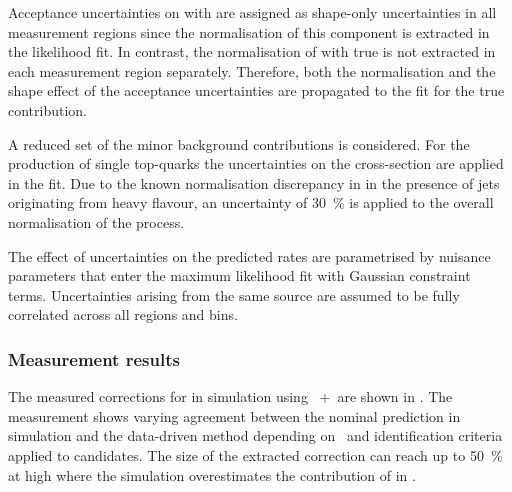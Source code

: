 Acceptance uncertainties on \ttbar with \faketauhadvis are assigned as
shape-only uncertainties in all measurement regions since the
normalisation of this component is extracted in the likelihood fit.
In contrast, the normalisation of \ttbar with true \tauhadvis is not
extracted in each measurement region separately. Therefore, both the
normalisation and the shape effect of the \ttbar acceptance
uncertainties are propagated to the fit for the true \tauhadvis
contribution.

A reduced set of the minor background contributions is considered. For
the production of single top-quarks the uncertainties on the cross-section
are applied in the fit. Due to the known normalisation
discrepancy in \Vjets in the presence of jets originating from heavy
flavour, an uncertainty of \SI{30}{\percent} is applied to the overall
normalisation of the process.

The effect of uncertainties on the predicted rates are parametrised by
nuisance parameters that enter the maximum likelihood fit with
Gaussian constraint terms. Uncertainties arising from the same source
are assumed to be fully correlated across all regions and bins.



\subsubsection{Measurement results}

The measured corrections for \faketauhadvis in \ttbar simulation using
\POWHEGBOX[v2]~+~\PYTHIA[8] are shown in
. The measurement shows varying agreement
between the nominal prediction in simulation and the data-driven
method depending on \tauhadvis~\pT and identification criteria applied
to \tauhadvis candidates. The size of the extracted correction can
reach up to \SI{50}{\percent} at high \tauhadvis \pT where the
simulation overestimates the contribution of \faketauhadvis in \ttbar.

